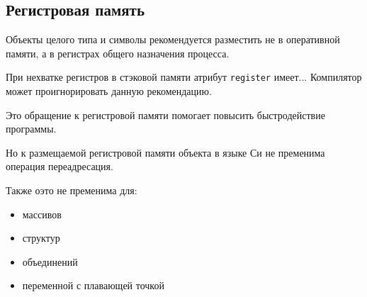 \subsection{Регистровая память}

Объекты целого типа и символы рекомендуется разместить не в оперативной памяти, а в регистрах общего назначения процесса.

При нехватке регистров в стэковой памяти атрибут \texttt{register} имеет... Компилятор может проигнорировать данную рекомендацию.

Это обращение к регистровой памяти помогает повысить быстродействие программы.

Но к размещаемой регистровой памяти объекта в языке Си не пременима операция переадресация.

Также оэто не пременима для:
\begin{itemize}
    \item массивов
    \item структур
    \item объединений
    \item переменной с плавающей точкой
\end{itemize}